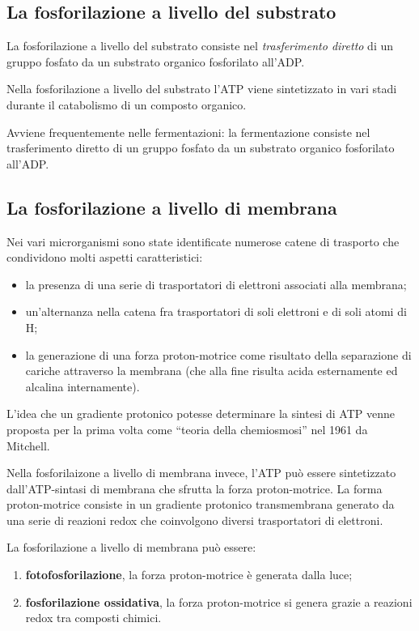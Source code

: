 \documentclass[11pt]{book}
\begin{document}
\subsection{La fosforilazione a livello del substrato}
La fosforilazione a livello del substrato consiste nel \emph{trasferimento diretto} di un gruppo fosfato da un substrato organico fosforilato all’ADP.

Nella fosforilazione a livello del substrato l’ATP viene sintetizzato in vari stadi durante il catabolismo di un composto organico.

Avviene frequentemente nelle fermentazioni:
la fermentazione consiste nel trasferimento diretto di un gruppo fosfato da un substrato organico fosforilato all’ADP.

\subsection{La fosforilazione a livello di membrana}
Nei vari microrganismi sono state identificate numerose catene di trasporto che condividono molti aspetti caratteristici:
\begin{itemize}
\item la presenza di una serie di trasportatori di elettroni associati alla membrana;
\item un'alternanza nella catena fra trasportatori di soli elettroni e di soli atomi di H;
\item la generazione di una forza proton-motrice come risultato della separazione di cariche attraverso la membrana (che alla fine risulta acida esternamente ed alcalina internamente).
\end{itemize}

L’idea che un gradiente protonico potesse determinare la sintesi di ATP venne proposta per la prima volta come ``teoria della chemiosmosi'' nel 1961 da Mitchell.

Nella fosforilaizone a livello di membrana invece, l'ATP può essere sintetizzato dall’ATP-sintasi di membrana che sfrutta la forza proton-motrice. La forma proton-motrice consiste in un gradiente protonico transmembrana generato da una serie di reazioni redox che coinvolgono diversi trasportatori di elettroni.

La fosforilazione a livello di membrana può essere:
\begin{enumerate}
\item \textbf{fotofosforilazione}, la forza proton-motrice è generata dalla luce;
\item \textbf{fosforilazione ossidativa}, la forza proton-motrice si genera grazie a reazioni redox tra composti chimici.
\end{enumerate}
\end{document}

